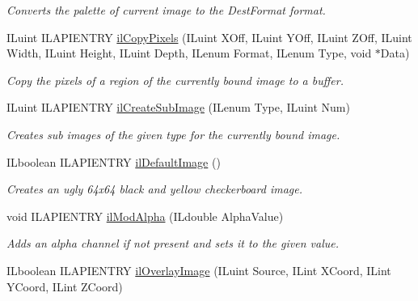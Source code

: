 \begin{DoxyCompactItemize}
\begin{DoxyCompactList}\small\item\em Converts the palette of current image to the Dest\-Format format. \end{DoxyCompactList}\item 
I\-Luint I\-L\-A\-P\-I\-E\-N\-T\-R\-Y \hyperlink{group__image__manip_gaa1410977695d1633907ff371e5b9c77e}{il\-Copy\-Pixels} (I\-Luint X\-Off, I\-Luint Y\-Off, I\-Luint Z\-Off, I\-Luint Width, I\-Luint Height, I\-Luint Depth, I\-Lenum Format, I\-Lenum Type, void $\ast$Data)
\begin{DoxyCompactList}\small\item\em Copy the pixels of a region of the currently bound image to a buffer. \end{DoxyCompactList}\item 
I\-Luint I\-L\-A\-P\-I\-E\-N\-T\-R\-Y \hyperlink{group__image__manip_gabc158c1aed9358ad456527f7cdb03446}{il\-Create\-Sub\-Image} (I\-Lenum Type, I\-Luint Num)
\begin{DoxyCompactList}\small\item\em Creates sub images of the given type for the currently bound image. \end{DoxyCompactList}\item 
\hypertarget{group__image__manip_ga3084506414c867df1f37234d996e2501}{I\-Lboolean I\-L\-A\-P\-I\-E\-N\-T\-R\-Y \hyperlink{group__image__manip_ga3084506414c867df1f37234d996e2501}{il\-Default\-Image} ()}\label{group__image__manip_ga3084506414c867df1f37234d996e2501}

\begin{DoxyCompactList}\small\item\em Creates an ugly 64x64 black and yellow checkerboard image. \end{DoxyCompactList}\item 
void I\-L\-A\-P\-I\-E\-N\-T\-R\-Y \hyperlink{group__image__manip_gaca8654129c04ebccba49f71d7e13edfe}{il\-Mod\-Alpha} (I\-Ldouble Alpha\-Value)
\begin{DoxyCompactList}\small\item\em Adds an alpha channel if not present and sets it to the given value. \end{DoxyCompactList}\item 
\hypertarget{group__image__manip_ga2e07d47b40a202e9fdf26d49e8dcdd4c}{I\-Lboolean I\-L\-A\-P\-I\-E\-N\-T\-R\-Y \hyperlink{group__image__manip_ga2e07d47b40a202e9fdf26d49e8dcdd4c}{il\-Overlay\-Image} (I\-Luint Source, I\-Lint X\-Coord, I\-Lint Y\-Coord, I\-Lint Z\-Coord)}\label{group__image__manip_ga2e07d47b40a202e9fdf26d49e8dcdd4c}


\end{DoxyCompactItemize}
